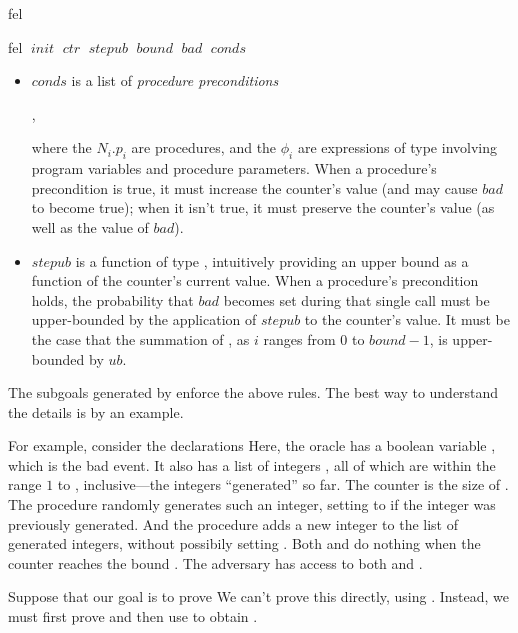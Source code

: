 \begin{tactic}{fel}
\begin{tsyntax}{fel $\;\mathit{init}$ $\;\mathit{ctr}$ $\;\mathit{stepub}$
                      $\;\mathit{bound}$ $\;\mathit{bad}$ $\;\mathit{conds}$}
\begin{itemize}
    \item $\mathit{conds}$ is a list of \emph{procedure preconditions}
      \begin{center}
        ,
      \end{center}
      where the $N_i$.$p_i$ are procedures, and the $\phi_i$ are
      expressions of type  involving program variables and
      procedure parameters.  When a procedure's precondition is true,
      it must increase the counter's value (and may cause
      $\mathit{bad}$ to become true); when it isn't true, it must
      preserve the counter's value (as well as the value of
      $\mathit{bad}$).

    \item $\mathit{stepub}$ is a function of type ,
      intuitively providing an upper bound as a function of the
      counter's current value. When a procedure's precondition holds,
      the probability that $\mathit{bad}$ becomes set during that
      single call must be upper-bounded by the application of
      $\mathit{stepub}$ to the counter's value. It must be the case
      that the summation of , as $i$
      ranges from $0$ to $\mathit{bound} - 1$, is upper-bounded by
      $\mathit{ub}$.

    \end{itemize}
    The subgoals generated by  enforce the above rules. The
    best way to understand the details is by an example.

    \medskip For example, consider the declarations
     Here, the oracle has
    a boolean variable , which is the bad event. It also has a
    list of integers , all of which are within the range $1$
    to , inclusive---the integers ``generated'' so far. The
    counter is the size of . The procedure  randomly
    generates such an integer, setting  to  if the
    integer was previously generated. And the procedure  adds
    a new integer to the list of generated integers, without possibily
    setting . Both  and  do nothing when the
    counter reaches the bound .  The adversary has access to both
     and .

    Suppose that our goal is to prove
    We can't prove this directly, using . Instead, we
    must first prove
    and then use  to obtain .


\end{tsyntax}
\end{tactic}
